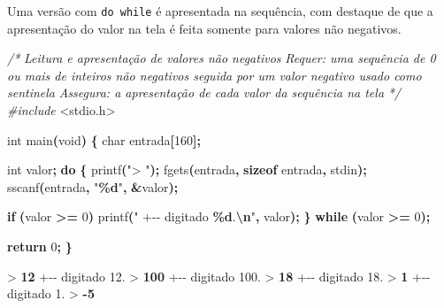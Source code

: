 \documentclass[
  11pt,
  a4paper,
]{scrbook}
\newenvironment{Shaded}{\begin{snugshade}}{\end{snugshade}}
\newcommand{\CommentTok}[1]{\textcolor[rgb]{0.56,0.35,0.01}{\textit{#1}}}
\newcommand{\ControlFlowTok}[1]{\textcolor[rgb]{0.13,0.29,0.53}{\textbf{#1}}}
\newcommand{\DataTypeTok}[1]{\textcolor[rgb]{0.13,0.29,0.53}{#1}}
\newcommand{\DecValTok}[1]{\textcolor[rgb]{0.00,0.00,0.81}{#1}}
\newcommand{\ImportTok}[1]{#1}
\newcommand{\KeywordTok}[1]{\textcolor[rgb]{0.13,0.29,0.53}{\textbf{#1}}}
\newcommand{\NormalTok}[1]{#1}
\newcommand{\OperatorTok}[1]{\textcolor[rgb]{0.81,0.36,0.00}{\textbf{#1}}}
\newcommand{\PreprocessorTok}[1]{\textcolor[rgb]{0.56,0.35,0.01}{\textit{#1}}}
\newcommand{\SpecialCharTok}[1]{\textcolor[rgb]{0.81,0.36,0.00}{\textbf{#1}}}
\newcommand{\StringTok}[1]{\textcolor[rgb]{0.31,0.60,0.02}{#1}}
\begin{document}
Uma versão com \texttt{do\ while} é apresentada na sequência, com
destaque de que a apresentação do valor na tela é feita somente para
valores não negativos.

\begin{Shaded}
\begin{Highlighting}[]
\CommentTok{/*}
\CommentTok{Leitura e apresentação de valores não negativos}
\CommentTok{Requer: uma sequência de 0 ou mais de inteiros não negativos seguida}
\CommentTok{    por um valor negativo usado como sentinela}
\CommentTok{Assegura: a apresentação de cada valor da sequência na tela}
\CommentTok{*/}
\PreprocessorTok{\#include }\ImportTok{\textless{}stdio.h\textgreater{}}

\DataTypeTok{int}\NormalTok{ main}\OperatorTok{(}\DataTypeTok{void}\OperatorTok{)} \OperatorTok{\{}
    \DataTypeTok{char}\NormalTok{ entrada}\OperatorTok{[}\DecValTok{160}\OperatorTok{];}

    \DataTypeTok{int}\NormalTok{ valor}\OperatorTok{;}
    \ControlFlowTok{do} \OperatorTok{\{}
\NormalTok{        printf}\OperatorTok{(}\StringTok{"\textgreater{} "}\OperatorTok{);}
\NormalTok{        fgets}\OperatorTok{(}\NormalTok{entrada}\OperatorTok{,} \KeywordTok{sizeof}\NormalTok{ entrada}\OperatorTok{,}\NormalTok{ stdin}\OperatorTok{);}
\NormalTok{        sscanf}\OperatorTok{(}\NormalTok{entrada}\OperatorTok{,} \StringTok{"}\SpecialCharTok{\%d}\StringTok{"}\OperatorTok{,} \OperatorTok{\&}\NormalTok{valor}\OperatorTok{);}

        \ControlFlowTok{if} \OperatorTok{(}\NormalTok{valor }\OperatorTok{\textgreater{}=} \DecValTok{0}\OperatorTok{)}
\NormalTok{            printf}\OperatorTok{(}\StringTok{"  +{-}{-} digitado }\SpecialCharTok{\%d}\StringTok{.}\SpecialCharTok{\textbackslash{}n}\StringTok{"}\OperatorTok{,}\NormalTok{ valor}\OperatorTok{);}
    \OperatorTok{\}} \ControlFlowTok{while} \OperatorTok{(}\NormalTok{valor }\OperatorTok{\textgreater{}=} \DecValTok{0}\OperatorTok{);}

    \ControlFlowTok{return} \DecValTok{0}\OperatorTok{;}
\OperatorTok{\}}
\end{Highlighting}
\end{Shaded}

\begin{Shaded}
\begin{Highlighting}[]
\NormalTok{\textgreater{} }\KeywordTok{ 12 }
\NormalTok{  +{-}{-} digitado 12.}
\NormalTok{\textgreater{} }\KeywordTok{ 100 }
\NormalTok{  +{-}{-} digitado 100.}
\NormalTok{\textgreater{} }\KeywordTok{ 18 }
\NormalTok{  +{-}{-} digitado 18.}
\NormalTok{\textgreater{} }\KeywordTok{ 1 }
\NormalTok{  +{-}{-} digitado 1.}
\NormalTok{\textgreater{} }\KeywordTok{ {-}5 }
\end{Highlighting}
\end{Shaded}
\end{document}

